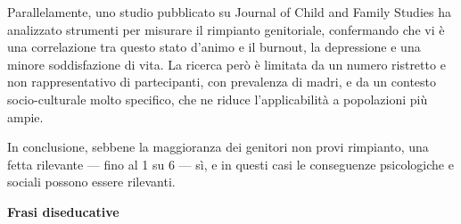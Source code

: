 \documentclass[12pt]{book} %
\begin{document}
Parallelamente, uno studio pubblicato su Journal of Child and Family Studies ha analizzato strumenti per misurare il rimpianto genitoriale, confermando che vi è una correlazione tra questo stato d’animo e il burnout, la depressione e una minore soddisfazione di vita. La ricerca però è limitata da un numero ristretto e non rappresentativo di partecipanti, con prevalenza di madri, e da un contesto socio-culturale molto specifico, che ne riduce l’applicabilità a popolazioni più ampie.

In conclusione, sebbene la maggioranza dei genitori non provi rimpianto, una fetta rilevante — fino al 1 su 6 — sì, e in questi casi le conseguenze psicologiche e sociali possono essere rilevanti.  

\textbf{Frasi diseducative}
\end{document}
